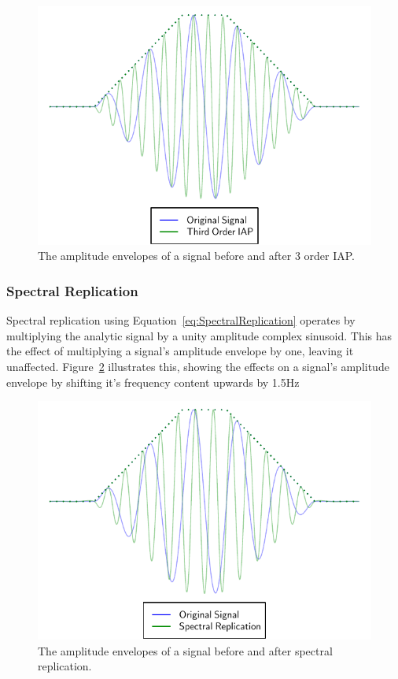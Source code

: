 			\begin{figure}[h!]
				\centering
				\includegraphics{chapter5/Images/IAPTemporalEffects.pdf}
				\caption{The amplitude envelopes of a signal before and after 3 order IAP.}
				\label{fig:IAPTemporalEffects}
			\end{figure}
			
		\subsubsection*{Spectral Replication}
			Spectral replication using Equation~\ref{eq:SpectralReplication} operates by multiplying the
			analytic signal by a unity amplitude complex sinusoid. This has the effect of multiplying a
			signal's amplitude envelope by one, leaving it unaffected.
			Figure~\ref{fig:SpectralReplicationTemporalEffects} illustrates this, showing the effects on a
			signal's amplitude envelope by shifting it's frequency content upwards by 1.5Hz

			\begin{figure}[h!]
				\centering
				\includegraphics{chapter5/Images/SpectralReplicationTemporalEffects.pdf}
				\caption{The amplitude envelopes of a signal before and after spectral replication.}
				\label{fig:SpectralReplicationTemporalEffects}
			\end{figure}

